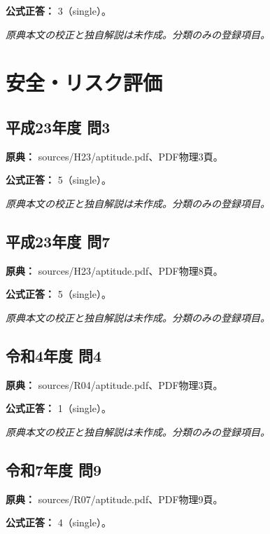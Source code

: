 \textbf{公式正答：} 3（single）。

\par\textit{原典本文の校正と独自解説は未作成。分類のみの登録項目。}

\section{安全・リスク評価}

\subsection{平成23年度 問3}
\label{q:h23-reg-apt-03}

\noindent\textbf{原典：} sources/H23/aptitude.pdf、PDF物理3頁。

\textbf{公式正答：} 5（single）。

\par\textit{原典本文の校正と独自解説は未作成。分類のみの登録項目。}

\subsection{平成23年度 問7}
\label{q:h23-reg-apt-07}

\noindent\textbf{原典：} sources/H23/aptitude.pdf、PDF物理8頁。

\textbf{公式正答：} 5（single）。

\par\textit{原典本文の校正と独自解説は未作成。分類のみの登録項目。}

\subsection{令和4年度 問4}
\label{q:r04-reg-apt-04}

\noindent\textbf{原典：} sources/R04/aptitude.pdf、PDF物理3頁。

\textbf{公式正答：} 1（single）。

\par\textit{原典本文の校正と独自解説は未作成。分類のみの登録項目。}

\subsection{令和7年度 問9}
\label{q:r07-reg-apt-09}

\noindent\textbf{原典：} sources/R07/aptitude.pdf、PDF物理9頁。

\textbf{公式正答：} 4（single）。

